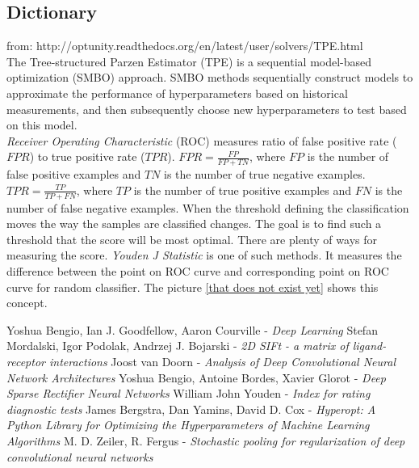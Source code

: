 \documentclass[a4paper,10pt]{report}
\begin{document}
   \begin{appendices}
    \chapter{Dictionary}\label{appendiks}
      from: http://optunity.readthedocs.org/en/latest/user/solvers/TPE.html\\
      
      The Tree-structured Parzen Estimator (TPE) is a sequential model-based optimization (SMBO) approach. SMBO methods sequentially construct models to approximate the performance of hyperparameters based on historical measurements, and then subsequently choose new hyperparameters to test based on this model.\\
      
      \emph{Receiver Operating Characteristic} (ROC) measures ratio of false positive rate ($FPR$) to true positive rate ($TPR$). $FPR = \frac{FP}{FP + TN}$, where $FP$ is the number of false positive examples and $TN$ is the number of true negative examples. $TPR = \frac{TP}{TP + FN}$, where $TP$ is the number of true positive examples and $FN$ is the number of false negative examples. When the threshold defining the classification moves the way the samples are classified changes. The goal is to find such a threshold that the score will be most optimal. There are plenty of ways for measuring the score. \emph{Youden J Statistic} is one of such methods. It measures the difference between the point on ROC curve and corresponding point on ROC curve for random classifier. The picture \ref{that does not exist yet} shows this concept.
      
  \end{appendices}
      
  \begin{thebibliography}{99}
      Yoshua Bengio, Ian J. Goodfellow, Aaron Courville - \emph{Deep Learning}
      Stefan Mordalski, Igor Podolak, Andrzej J. Bojarski - \emph{2D SIFt - a matrix of ligand-receptor interactions}
      Joost van Doorn - \emph{Analysis of Deep Convolutional Neural Network Architectures}
      Yoshua Bengio, Antoine Bordes, Xavier Glorot - \emph{Deep Sparse Rectifier Neural Networks}
     William John Youden - \emph{Index for rating diagnostic tests}
      James Bergstra, Dan Yamins, David D. Cox - \emph{Hyperopt: A Python Library for Optimizing the Hyperparameters of Machine Learning Algorithms}
       M. D. Zeiler, R. Fergus - \emph{Stochastic pooling for regularization of deep convolutional neural networks}
    
  \end{thebibliography}
  
\end{document}
